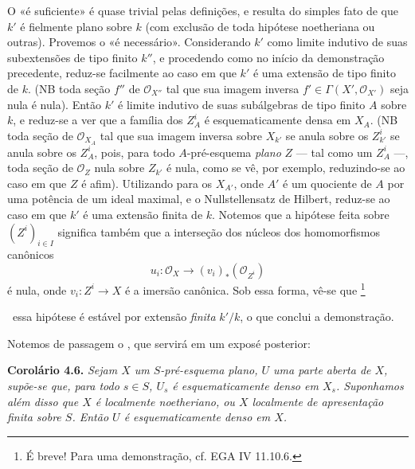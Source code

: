 O «é suficiente» é quase trivial pelas definições, e resulta do
simples fato de que \(k'\) é fielmente plano sobre \(k\) (com
exclusão de toda hipótese noetheriana ou outras). Provemos o «é
necessário». Considerando \(k'\) como limite indutivo de suas
subextensões de tipo finito \(k''\), e procedendo como no início da
demonstração precedente, reduz-se facilmente ao caso em que \(k'\)
é uma extensão de tipo finito de \(k\). (NB toda seção \(f''\)
de \(\mathscr O_{X''}\) tal que sua imagem inversa
\(f'\in\Gamma(X',\mathscr O_{X'})\) seja nula é nula). Então
\(k'\) é limite indutivo de suas subálgebras de tipo finito \(A\)
sobre \(k\), e reduz-se a ver que a família dos \(Z^i_A\) é
esquematicamente densa em \(X_A\). (NB toda seção de
\(\mathscr O_{X_A}\) tal que sua imagem inversa sobre \(X_{k'}\)
se anula sobre os \(Z^i_{k'}\) se anula sobre os \(Z^i_A\), pois,
para todo \(A\)-pré-esquema \emph{plano} \(Z\) --- tal como um
\(Z^i_A\) ---, toda seção de \(\mathscr O_Z\) nula sobre
\(Z_{k'}\) é nula, como se vê, por exemplo, reduzindo-se ao caso
em que \(Z\) é afim). Utilizando
 para os \(X_{A'}\), onde
\(A'\) é um quociente de \(A\) por uma potência de um ideal
maximal, e o Nullstellensatz de Hilbert, reduz-se ao caso em que
\(k'\) é uma extensão finita de \(k\). Notemos que a hipótese
feita sobre \((Z^i)_{i\in I}\) significa também que a interseção
dos núcleos dos homomorfismos canônicos
\[
  u_i:\mathscr O_X\longrightarrow(v_i)_*(\mathscr O_{Z^i})
\]
é nula, onde \(v_i:Z^i\to X\) é a imersão canônica. Sob essa
forma, vê-se que\begingroup
\renewcommand{\thefootnote}{\(\ast\)}%
\footnote{É breve! Para uma demonstração, cf. EGA IV 11.10.6.}%
\addtocounter{footnote}{-1}%
\endgroup\ essa hipótese é estável por extensão \emph{finita}
\(k'/k\), o que conclui a demonstração.

Notemos de passagem o
, que servirá
em um exposé posterior:

\medskip
\noindent{}\textbf{Corolário 4.6.}
\textit{Sejam \(X\) um \(S\)-pré-esquema plano, \(U\) uma parte
aberta de \(X\), supõe-se que, para todo \(s\in S\), \(U_s\) é
esquematicamente denso em \(X_s\). Suponhamos além disso que \(X\)
é localmente noetheriano, ou \(X\) localmente de apresentação
finita sobre \(S\). Então \(U\) é esquematicamente denso em \(X\).}

